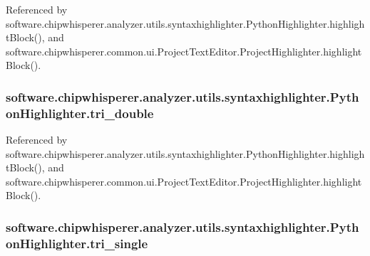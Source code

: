 Referenced by software.\+chipwhisperer.\+analyzer.\+utils.\+syntaxhighlighter.\+Python\+Highlighter.\+highlight\+Block(), and software.\+chipwhisperer.\+common.\+ui.\+Project\+Text\+Editor.\+Project\+Highlighter.\+highlight\+Block().

\hypertarget{classsoftware_1_1chipwhisperer_1_1analyzer_1_1utils_1_1syntaxhighlighter_1_1PythonHighlighter_a28f1aa6d52aab1f3ba742b8f93a9ac39}{}
\subsubsection[{tri\+\_\+double}]{\setlength{\rightskip}{0pt plus 5cm}software.\+chipwhisperer.\+analyzer.\+utils.\+syntaxhighlighter.\+Python\+Highlighter.\+tri\+\_\+double}\label{classsoftware_1_1chipwhisperer_1_1analyzer_1_1utils_1_1syntaxhighlighter_1_1PythonHighlighter_a28f1aa6d52aab1f3ba742b8f93a9ac39}


Referenced by software.\+chipwhisperer.\+analyzer.\+utils.\+syntaxhighlighter.\+Python\+Highlighter.\+highlight\+Block(), and software.\+chipwhisperer.\+common.\+ui.\+Project\+Text\+Editor.\+Project\+Highlighter.\+highlight\+Block().

\hypertarget{classsoftware_1_1chipwhisperer_1_1analyzer_1_1utils_1_1syntaxhighlighter_1_1PythonHighlighter_a20db7befbb80fc505e9f641ee97ea9ef}{}
\subsubsection[{tri\+\_\+single}]{\setlength{\rightskip}{0pt plus 5cm}software.\+chipwhisperer.\+analyzer.\+utils.\+syntaxhighlighter.\+Python\+Highlighter.\+tri\+\_\+single}\label{classsoftware_1_1chipwhisperer_1_1analyzer_1_1utils_1_1syntaxhighlighter_1_1PythonHighlighter_a20db7befbb80fc505e9f641ee97ea9ef}



